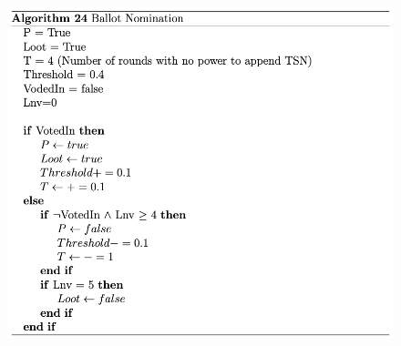 

\begin{figure}[htb]
    \centering
    \includegraphics[scale=0.7]{006_team_3_agent_design/FIGS/Algo24.png}
    \label{fig:algo24}
\end{figure}


